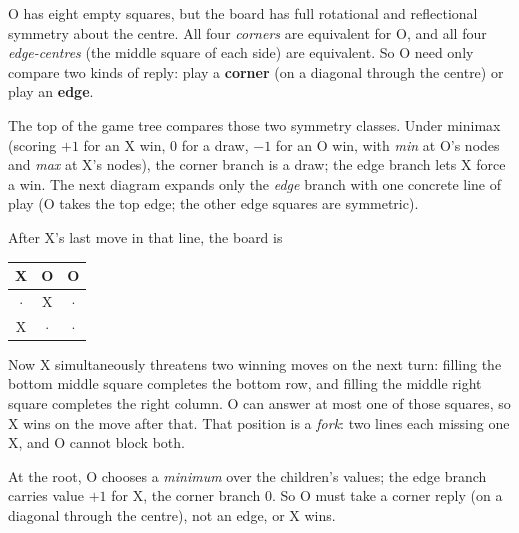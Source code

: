\noindent
O has eight empty squares, but the board has full rotational and reflectional
symmetry about the centre. All four \emph{corners} are equivalent for O, and all
four \emph{edge-centres} (the middle square of each side) are equivalent. So O
need only compare two kinds of reply: play a \textbf{corner} (on a diagonal
through the centre) or play an \textbf{edge}.

The top of the game tree compares those two symmetry classes. Under minimax
(scoring \(+1\) for an X win, \(0\) for a draw, \(-1\) for an O win, with
\emph{min} at O's nodes and \emph{max} at X's nodes), the corner branch is a
draw; the edge branch lets X force a win. The next diagram expands only the
\emph{edge} branch with one concrete line of play (O takes the top edge; the
other edge squares are symmetric).

\begin{center}
\end{center}

\noindent
After X's last move in that line, the board is
\begin{center}
\begin{tabular}{|c|c|c|}
\hline
X & O & O \\
\hline
\(\cdot\) & X & \(\cdot\) \\
\hline
X & \(\cdot\) & \(\cdot\) \\
\hline
\end{tabular}
\end{center}
\noindent
Now X simultaneously threatens two winning moves on the next turn: filling the
bottom middle square completes the bottom row, and filling the middle right square
completes the right column. O can answer at most one of those squares, so X
wins on the move after that. That position is a \emph{fork}: two lines each
missing one X, and O cannot block both.

At the root, O chooses a \emph{minimum} over the children's values; the edge
branch carries value \(+1\) for X, the corner branch \(0\). So O must take a
corner reply (on a diagonal through the centre), not an edge, or X wins.
